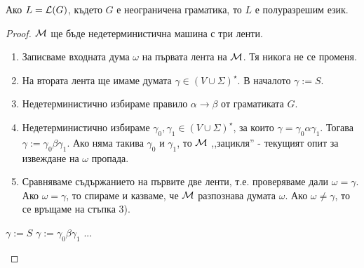 \begin{lemma}
  Ако $L = \mathcal{L}(G)$, където $G$ е неограничена граматика, то $L$ е полуразрешим език.
\end{lemma}
\begin{proof}
  $\mathcal{M}$ ще бъде недетерминистична машина с три ленти.
  \begin{enumerate}[1)]
  \item
    Записваме входната дума $\omega$ на първата лента на $\mathcal{M}$.
    Тя никога не се променя.
  \item
    На втората лента ще имаме думата $\gamma \in (V\cup\Sigma)^\star$.
    В началото $\gamma := S$.
  \item 
    Недетерминистично избираме правило $\alpha \to \beta$ от граматиката $G$.
  \item
    Недетерминистично избираме $\gamma_0,\gamma_1 \in (V\cup\Sigma)^\star$, за които 
    $\gamma = \gamma_0\alpha\gamma_1$.
    Тогава $\gamma := \gamma_0\beta\gamma_1$.
    Ако няма такива $\gamma_0$ и $\gamma_1$, то $\mathcal{M}$ ,,зацикля'' - текущият опит за извеждане на $\omega$ пропада.
  \item
    Сравняваме съдържанието на първите две ленти, т.е. проверяваме дали $\omega = \gamma$.
    Ако $\omega = \gamma$, то спираме и казваме, че $\mathcal{M}$ разпознава думата $\omega$.
    Ако $\omega \neq \gamma$, то се връщаме на стъпка 3).
  \end{enumerate}

  \begin{algorithm}[H]
  \caption{}
  \begin{algorithmic}[1]
    \State $\gamma:= S$
    \State $\gamma := \gamma_0\beta\gamma_1$
    \Else ...
    \EndIf
    \EndFor
  \end{algorithmic}
\end{algorithm}

\end{proof}

